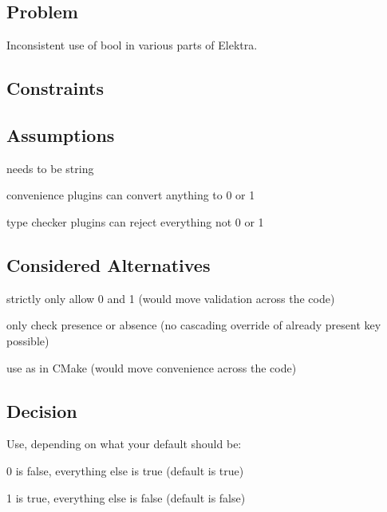 \subsection*{Problem}

Inconsistent use of bool in various parts of Elektra.

\subsection*{Constraints}

\subsection*{Assumptions}


\begin{DoxyItemize}
\item needs to be string
\item convenience plugins can convert anything to 0 or 1
\item type checker plugins can reject everything not 0 or 1
\end{DoxyItemize}

\subsection*{Considered Alternatives}


\begin{DoxyItemize}
\item strictly only allow 0 and 1 (would move validation across the code)
\item only check presence or absence (no cascading override of already present key possible)
\item use as in C\+Make (would move convenience across the code)
\end{DoxyItemize}

\subsection*{Decision}

Use, depending on what your default should be\+:


\begin{DoxyItemize}
\item 0 is false, everything else is true (default is true)
\item 1 is true, everything else is false (default is false)
\end{DoxyItemize}

